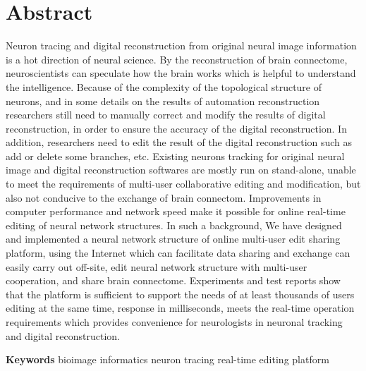 \chapter{Abstract}

Neuron tracing and digital reconstruction from original neural image information is a hot direction of neural science. By the reconstruction of brain connectome, neuroscientists can speculate how the brain works which is helpful to understand the intelligence. Because of the complexity of the topological structure of neurons, and in some details on the results of automation reconstruction researchers still need to manually correct and modify the results of digital reconstruction, in order to ensure the accuracy of the digital reconstruction. In addition, researchers need to edit the result of the digital reconstruction such as add or delete some branches, etc. Existing neurons tracking for original neural image and digital reconstruction softwares are mostly run on stand-alone, unable to meet the requirements of multi-user collaborative editing and modification, but also not conducive to the exchange of brain connectom. Improvements in computer performance and network speed make it possible for online real-time editing of neural network structures. In such a background, We have designed and implemented a neural network structure of online multi-user edit sharing platform, using the Internet which can facilitate data sharing and exchange can easily carry out off-site, edit neural network structure with multi-user cooperation, and share brain connectome. Experiments and test reports show that the platform is sufficient to support the needs of at least thousands of users editing at the same time, response in milliseconds, meets the real-time operation requirements which provides convenience for neurologists in neuronal tracking and digital reconstruction.

{
    \vspace{1em}
    \setlength{\parindent}{0em}
    \textbf{Keywords} \; bioimage informatics \;  neuron tracing \; real-time editing platform \par
}
